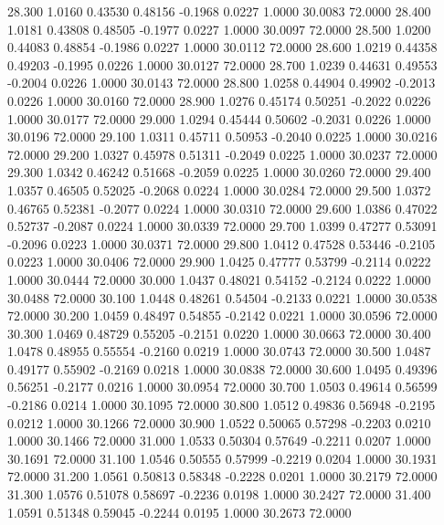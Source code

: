   28.300   1.0160   0.43530   0.48156  -0.1968   0.0227   1.0000  30.0083  72.0000
  28.400   1.0181   0.43808   0.48505  -0.1977   0.0227   1.0000  30.0097  72.0000
  28.500   1.0200   0.44083   0.48854  -0.1986   0.0227   1.0000  30.0112  72.0000
  28.600   1.0219   0.44358   0.49203  -0.1995   0.0226   1.0000  30.0127  72.0000
  28.700   1.0239   0.44631   0.49553  -0.2004   0.0226   1.0000  30.0143  72.0000
  28.800   1.0258   0.44904   0.49902  -0.2013   0.0226   1.0000  30.0160  72.0000
  28.900   1.0276   0.45174   0.50251  -0.2022   0.0226   1.0000  30.0177  72.0000
  29.000   1.0294   0.45444   0.50602  -0.2031   0.0226   1.0000  30.0196  72.0000
  29.100   1.0311   0.45711   0.50953  -0.2040   0.0225   1.0000  30.0216  72.0000
  29.200   1.0327   0.45978   0.51311  -0.2049   0.0225   1.0000  30.0237  72.0000
  29.300   1.0342   0.46242   0.51668  -0.2059   0.0225   1.0000  30.0260  72.0000
  29.400   1.0357   0.46505   0.52025  -0.2068   0.0224   1.0000  30.0284  72.0000
  29.500   1.0372   0.46765   0.52381  -0.2077   0.0224   1.0000  30.0310  72.0000
  29.600   1.0386   0.47022   0.52737  -0.2087   0.0224   1.0000  30.0339  72.0000
  29.700   1.0399   0.47277   0.53091  -0.2096   0.0223   1.0000  30.0371  72.0000
  29.800   1.0412   0.47528   0.53446  -0.2105   0.0223   1.0000  30.0406  72.0000
  29.900   1.0425   0.47777   0.53799  -0.2114   0.0222   1.0000  30.0444  72.0000
  30.000   1.0437   0.48021   0.54152  -0.2124   0.0222   1.0000  30.0488  72.0000
  30.100   1.0448   0.48261   0.54504  -0.2133   0.0221   1.0000  30.0538  72.0000
  30.200   1.0459   0.48497   0.54855  -0.2142   0.0221   1.0000  30.0596  72.0000
  30.300   1.0469   0.48729   0.55205  -0.2151   0.0220   1.0000  30.0663  72.0000
  30.400   1.0478   0.48955   0.55554  -0.2160   0.0219   1.0000  30.0743  72.0000
  30.500   1.0487   0.49177   0.55902  -0.2169   0.0218   1.0000  30.0838  72.0000
  30.600   1.0495   0.49396   0.56251  -0.2177   0.0216   1.0000  30.0954  72.0000
  30.700   1.0503   0.49614   0.56599  -0.2186   0.0214   1.0000  30.1095  72.0000
  30.800   1.0512   0.49836   0.56948  -0.2195   0.0212   1.0000  30.1266  72.0000
  30.900   1.0522   0.50065   0.57298  -0.2203   0.0210   1.0000  30.1466  72.0000
  31.000   1.0533   0.50304   0.57649  -0.2211   0.0207   1.0000  30.1691  72.0000
  31.100   1.0546   0.50555   0.57999  -0.2219   0.0204   1.0000  30.1931  72.0000
  31.200   1.0561   0.50813   0.58348  -0.2228   0.0201   1.0000  30.2179  72.0000
  31.300   1.0576   0.51078   0.58697  -0.2236   0.0198   1.0000  30.2427  72.0000
  31.400   1.0591   0.51348   0.59045  -0.2244   0.0195   1.0000  30.2673  72.0000
